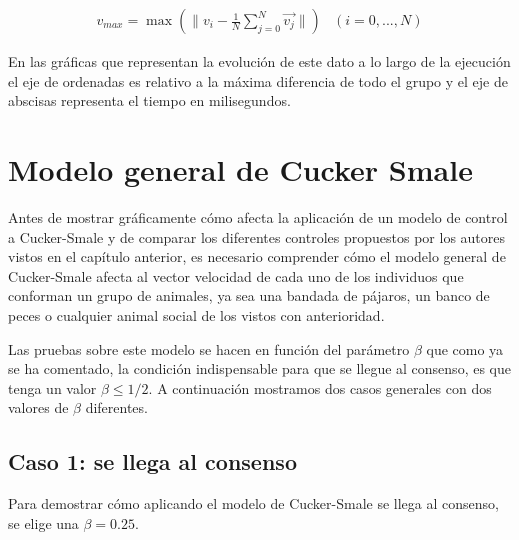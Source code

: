 \begin{equation}\label{eq:vmax}
    \begin{array}{l}
        v_{max} = \displaystyle{\max\left(\|v_{i}-\frac{1}{N}\sum_{j=0}^{N}\vec{v_{j}}\|\right)}
    \end{array}
    \begin{array}{r}
        (i= 0, ..., N)
    \end{array}
\end{equation}

En las gráficas que representan la evolución de este dato a lo largo de la ejecución el eje de ordenadas es relativo a la máxima diferencia de todo el grupo y el eje de abscisas representa el tiempo en milisegundos.

\section{Modelo general de Cucker Smale} \label{s4_3}
Antes de mostrar gráficamente cómo afecta la aplicación de un modelo de control a Cucker-Smale y de comparar los diferentes controles propuestos por los autores vistos en el capítulo anterior, es necesario comprender cómo el modelo general de Cucker-Smale afecta al vector velocidad de cada uno de los individuos que conforman un grupo de animales, ya sea una bandada de pájaros, un banco de peces o cualquier animal social de los vistos con anterioridad. 

Las pruebas sobre este modelo se hacen en función del parámetro $\beta$ que como ya se ha comentado, la condición indispensable para que se llegue al consenso, es que tenga un valor $\beta \leq 1/2$. A continuación mostramos dos casos generales con dos valores de $\beta$ diferentes.

\subsection{Caso 1: se llega al consenso} \label{s4_3_1}
Para demostrar cómo aplicando el modelo de Cucker-Smale se llega al consenso, se elige una $\beta = 0.25$. 

